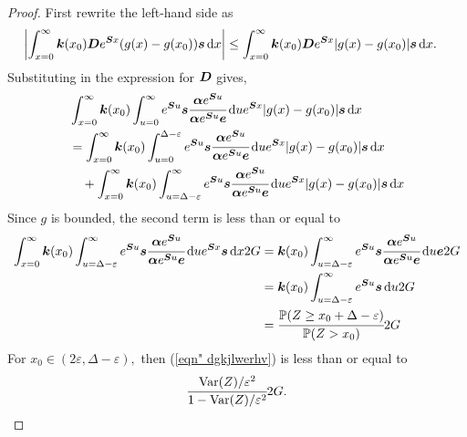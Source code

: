 \begin{proof}
	First rewrite the left-hand side as 
	\begin{align}
		\left|\int_{x=0}^\infty \boldsymbol k(x_0)\boldsymbol De^{\boldsymbol Sx}(g(x)-g(x_0))\boldsymbol s\, \mathrm{d} x \right|
		&\leq \int_{x=0}^\infty \boldsymbol k(x_0)\boldsymbol De^{\boldsymbol Sx}|g(x)-g(x_0)|\boldsymbol s\, \mathrm{d} x.
	\end{align}
	Substituting in the expression for \(\boldsymbol D\) gives,
	\begin{align}
		&\int_{x=0}^\infty \boldsymbol k(x_0)\int_{u=0}^\infty e^{\boldsymbol Su}\boldsymbol s \cfrac{\boldsymbol \alpha e^{\boldsymbol Su}}{\boldsymbol \alpha e^{\boldsymbol Su}\boldsymbol e} \, \mathrm{d} u e^{\boldsymbol Sx}|g(x)-g(x_0)|\boldsymbol s\, \mathrm{d} x  \nonumber 
		\\&= \int_{x=0}^\infty \boldsymbol k(x_0)\int_{u=0}^{\Delta-\varepsilon} e^{\boldsymbol Su}\boldsymbol s \cfrac{\boldsymbol \alpha e^{\boldsymbol Su}}{\boldsymbol \alpha e^{\boldsymbol Su}\boldsymbol e} \, \mathrm{d} u e^{\boldsymbol Sx}|g(x)-g(x_0)|\boldsymbol s\, \mathrm{d} x \nonumber
		\\&\quad {} + \int_{x=0}^\infty \boldsymbol k(x_0)\int_{u=\Delta-\varepsilon}^\infty e^{\boldsymbol Su}\boldsymbol s \cfrac{\boldsymbol \alpha e^{\boldsymbol Su}}{\boldsymbol \alpha e^{\boldsymbol Su}\boldsymbol e} \, \mathrm{d} u e^{\boldsymbol Sx}|g(x)-g(x_0)|\boldsymbol s\, \mathrm{d} x \label{eqn: 2nd here}
	\end{align}
	Since \(g\) is bounded, the second term is less than or equal to 
	\begin{align}
		\int_{x=0}^\infty \boldsymbol k(x_0)\int_{u=\Delta-\varepsilon}^\infty e^{\boldsymbol Su}\boldsymbol s \cfrac{\boldsymbol \alpha e^{\boldsymbol Su}}{\boldsymbol \alpha e^{\boldsymbol Su}\boldsymbol e} \, \mathrm{d} u e^{\boldsymbol Sx}\boldsymbol s\, \mathrm{d} x 2G \nonumber
		&= \boldsymbol k(x_0)\int_{u=\Delta-\varepsilon}^\infty e^{\boldsymbol Su}\boldsymbol s \cfrac{\boldsymbol \alpha e^{\boldsymbol Su}}{\boldsymbol \alpha e^{\boldsymbol Su}\boldsymbol e} \, \mathrm{d} u \boldsymbol e 2G \nonumber
		\\&= \boldsymbol k(x_0)\int_{u=\Delta-\varepsilon}^\infty e^{\boldsymbol Su}\boldsymbol s \, \mathrm{d} u2G \nonumber
		\\&= \cfrac{\mathbb P(Z\geq x_0+\Delta-\varepsilon)}{\mathbb P(Z>x_0)}2G \label{eqn" dgkjlwerhv}
	\end{align}
	For \(x_0\in(2\varepsilon,\Delta-\varepsilon),\) then (\ref{eqn" dgkjlwerhv}) is less than or equal to 
	\[\cfrac{\mathrm{Var}(Z)/\varepsilon^2}{1-\mathrm{Var}(Z)/\varepsilon^2}2G.\]
	

\end{proof}
